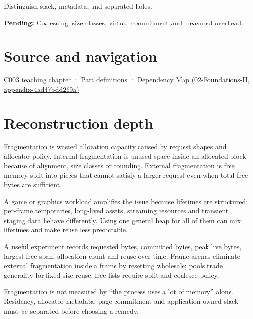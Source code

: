 Distinguish slack, metadata, and separated holes.

\textbf{Pending:} Coalescing, size classes, virtual commitment and measured overhead.

\section{Source and navigation}\label{appendix-a7c50686d81f-source-and-navigation}

\href{Continuous\%20Notes/Computing\%20Foundations\%20-\%20From\%20Bits\%20to\%20C++\%20and\%20Systems\%20APIs\#Where\%20the\%20bytes\%20live}{C003 teaching chapter} · \hyperref[appendix-fd090d982a15-m003---parts-41-60]{Part definitions} · \href{../02-Foundations-II/main.pdf\#nameddest=appendix-4ad47bdd269a}{Dependency Map (02-Foundations-II, appendix-4ad47bdd269a)}

\section{Reconstruction depth}\label{appendix-a7c50686d81f-reconstruction-depth}

Fragmentation is wasted allocation capacity caused by request shapes and allocator policy. Internal fragmentation is unused space inside an allocated block because of alignment, size classes or rounding. External fragmentation is free memory split into pieces that cannot satisfy a larger request even when total free bytes are sufficient.

A game or graphics workload amplifies the issue because lifetimes are structured: per-frame temporaries, long-lived assets, streaming resources and transient staging data behave differently. Using one general heap for all of them can mix lifetimes and make reuse less predictable.

A useful experiment records requested bytes, committed bytes, peak live bytes, largest free span, allocation count and reuse over time. Frame arenas eliminate external fragmentation inside a frame by resetting wholesale; pools trade generality for fixed-size reuse; free lists require split and coalesce policy.

Fragmentation is not measured by ``the process uses a lot of memory'' alone. Residency, allocator metadata, page commitment and application-owned slack must be separated before choosing a remedy.
